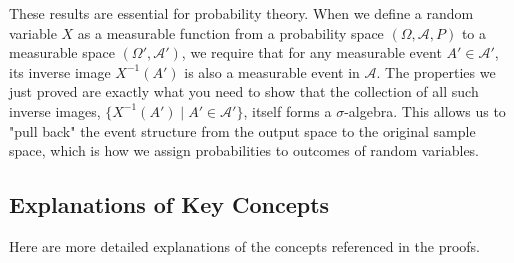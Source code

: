 \documentclass[11pt,a4paper]{article}
\begin{document}
These results are essential for probability theory. When we define a random variable $X$ as a measurable function from a probability space $(\Omega, \mathcal{A}, P)$ to a measurable space $(\Omega', \mathcal{A}')$, we require that for any measurable event $A' \in \mathcal{A}'$, its inverse image $X^{-1}(A')$ is also a measurable event in $\mathcal{A}$. The properties we just proved are exactly what you need to show that the collection of all such inverse images, $\{X^{-1}(A') \mid A' \in \mathcal{A}'\}$, itself forms a $\sigma$-algebra. This allows us to "pull back" the event structure from the output space to the original sample space, which is how we assign probabilities to outcomes of random variables.

\subsection*{Explanations of Key Concepts}

Here are more detailed explanations of the concepts referenced in the proofs.
\end{document}
